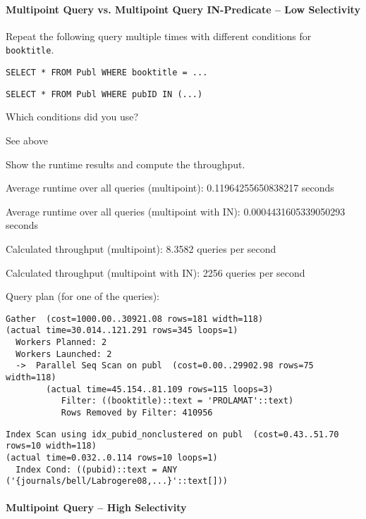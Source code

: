 \documentclass[11pt]{scrartcl}
\begin{document}
\paragraph{Multipoint Query vs. Multipoint Query IN-Predicate -- Low Selectivity}

Repeat the following query multiple times with different conditions for \texttt{booktitle}.

\begin{lstlisting}[style=dbtsql]
SELECT * FROM Publ WHERE booktitle = ...
\end{lstlisting}

\begin{lstlisting}[style=dbtsql]
SELECT * FROM Publ WHERE pubID IN (...)
\end{lstlisting}


Which conditions did you use?

See above

Show the runtime results and compute the throughput.

Average runtime over all queries (multipoint): 0.11964255650838217 seconds

Average runtime over all queries (multipoint with IN): 0.0004431605339050293 seconds

Calculated throughput (multipoint): 8.3582 queries per second

Calculated throughput (multipoint with IN): 2256 queries per second 

Query plan (for one of the queries):

{\small
\parskip0pt\begin{verbatim}
Gather  (cost=1000.00..30921.08 rows=181 width=118) 
(actual time=30.014..121.291 rows=345 loops=1)
  Workers Planned: 2
  Workers Launched: 2
  ->  Parallel Seq Scan on publ  (cost=0.00..29902.98 rows=75 width=118) 
        (actual time=45.154..81.109 rows=115 loops=3)
           Filter: ((booktitle)::text = 'PROLAMAT'::text)
           Rows Removed by Filter: 410956
\end{verbatim}}

{\small
\parskip0pt\begin{verbatim}
Index Scan using idx_pubid_nonclustered on publ  (cost=0.43..51.70 rows=10 width=118) 
(actual time=0.032..0.114 rows=10 loops=1)
  Index Cond: ((pubid)::text = ANY ('{journals/bell/Labrogere08,...}'::text[]))
\end{verbatim}}

\paragraph{Multipoint Query -- High Selectivity}
\end{document}
